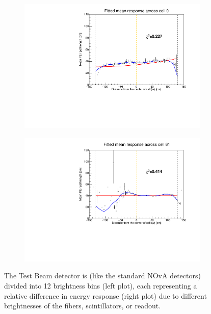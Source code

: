\documentclass[12pt,a4paper]{article}
\begin{document}
\begin{figure}[h]
\centering
\begin{subfigure}[b]{0.495\textwidth}
\centering
\includegraphics[width=\textwidth]{Plots/ExampleCellForFBFile_3000.pdf}
\end{subfigure}
\begin{subfigure}[b]{0.495\textwidth}
\centering
\includegraphics[width=\textwidth]{Plots/ExampleCellForFBFile_61061.pdf}
\end{subfigure}
\caption{The Test Beam detector is (like the standard NOvA detectors) divided into 12 brightness bins (left plot), each representing a relative difference in energy response (right plot) due to different brightnesses of the fibers, scintillators, or readout.}
\label{figFiberBrightnessExamples}
\end{figure}
\end{document}
